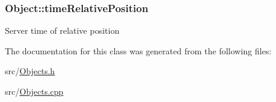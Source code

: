 \subsubsection[{\texorpdfstring{time\+Relative\+Position}{timeRelativePosition}}]{ Object\+::time\+Relative\+Position\hspace{0.3cm}{\ttfamily [protected]}}\hypertarget{classObject_a0efe361db316649d7d40132b76ed8d41}{}\label{classObject_a0efe361db316649d7d40132b76ed8d41}
Server time of relative position 

The documentation for this class was generated from the following files\+:\begin{DoxyCompactItemize}
\item 
src/\hyperlink{Objects_8h}{Objects.\+h}\item 
src/\hyperlink{Objects_8cpp}{Objects.\+cpp}\end{DoxyCompactItemize}
